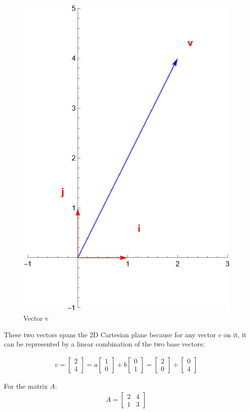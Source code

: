 \documentclass[stu,12pt,floatsintext]{apa7}
\begin{document}
\begin{figure}[h]
    \centering
    \includegraphics[height=0.8\textwidth]{images/vector1.png}
    \caption{Vector v}
    \label{fig:vector1}
\end{figure}

These two vectors spans the 2D Cartesian plane because for any vector $v$ on it, it can be represented by a linear combination of the two base vectors:

\begin{gather}
    \label{eq:linear-transformation1}
    v=\begin{bmatrix}
        2\\4
    \end{bmatrix}=a\begin{bmatrix}
        1\\0
    \end{bmatrix}+b\begin{bmatrix}
        0\\1
    \end{bmatrix}
    =\begin{bmatrix}
        2\\0
    \end{bmatrix}+
    \begin{bmatrix}
        0\\4
    \end{bmatrix}
\end{gather}

For the matrix $A$:
\begin{gather}
    A=\begin{bmatrix}
        2 & 4\\
        1 & 3
    \end{bmatrix}
\end{gather}
\end{document}
